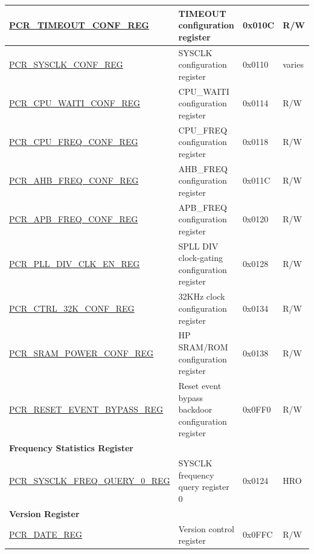 \begin{longtable}{ | p{6cm} | p{7.2cm} | p{1.3cm} | p{1cm} | }
\hyperref[regdesc:PCRTIMEOUTCONFREG]{PCR\_TIMEOUT\_CONF\_REG} & TIMEOUT configuration register & 0x010C & R/W \\ \hline
\hyperref[regdesc:PCRSYSCLKCONFREG]{PCR\_SYSCLK\_CONF\_REG} & SYSCLK configuration register & 0x0110 & varies \\ \hline
\hyperref[regdesc:PCRCPUWAITICONFREG]{PCR\_CPU\_WAITI\_CONF\_REG} & CPU\_WAITI configuration register & 0x0114 & R/W \\ \hline
\hyperref[regdesc:PCRCPUFREQCONFREG]{PCR\_CPU\_FREQ\_CONF\_REG} & CPU\_FREQ configuration register & 0x0118 & R/W \\ \hline
\hyperref[regdesc:PCRAHBFREQCONFREG]{PCR\_AHB\_FREQ\_CONF\_REG} & AHB\_FREQ configuration register & 0x011C & R/W \\ \hline
\hyperref[regdesc:PCRAPBFREQCONFREG]{PCR\_APB\_FREQ\_CONF\_REG} & APB\_FREQ configuration register & 0x0120 & R/W \\ \hline
\hyperref[regdesc:PCRPLLDIVCLKENREG]{PCR\_PLL\_DIV\_CLK\_EN\_REG} & SPLL DIV clock-gating configuration register & 0x0128 & R/W \\ \hline
\hyperref[regdesc:PCRCTRL32KCONFREG]{PCR\_CTRL\_32K\_CONF\_REG} & 32KHz clock configuration register & 0x0134 & R/W \\ \hline
\hyperref[regdesc:PCRSRAMPOWERCONFREG]{PCR\_SRAM\_POWER\_CONF\_REG} & HP SRAM/ROM configuration register & 0x0138 & R/W \\ \hline
\hyperref[regdesc:PCRRESETEVENTBYPASSREG]{PCR\_RESET\_EVENT\_BYPASS\_REG} & Reset event bypass backdoor configuration register & 0x0FF0 & R/W \\ \hline
\multicolumn{4}{|l|}{\textbf{Frequency Statistics Register}} \\ \hline
\hyperref[regdesc:PCRSYSCLKFREQQUERY0REG]{PCR\_SYSCLK\_FREQ\_QUERY\_0\_REG} & SYSCLK frequency query register 0 & 0x0124 & HRO \\ \hline
\multicolumn{4}{|l|}{\textbf{Version Register}} \\ \hline
\hyperref[regdesc:PCRDATEREG]{PCR\_DATE\_REG} & Version control register & 0x0FFC & R/W \\ \hline
\end{longtable}
